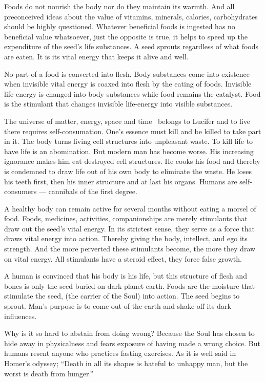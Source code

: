 \documentclass[12pt,letterpaper]{article}
\newcommand{\emdash}{---}
\newcommand{\mest}{matter, energy, space and time }
\begin{document}
Foods do not nourish the body nor do they maintain its warmth. And all
preconceived ideas about the value of vitamins, minerals, calories,
carbohydrates should be highly questioned. Whatever beneficial foods
is ingested has no beneficial value whatsoever, just the opposite is
true, it helps to speed up the expenditure of the seed's life
substances. A seed sprouts regardless of what foods are eaten. It is
its vital energy that keeps it alive and well.

No part of a food is converted into flesh. Body substances come into
existence when invisible vital energy is coaxed into flesh by the
eating of foods.  Invisible life-energy is changed into body
substances while food remains the catalyst. Food is the stimulant that
changes invisible life-energy into visible substances.

The universe of \mest\ belongs to Lucifer and to live there requires
self-consumation. One's essence must kill and be killed to take part
in it. The body turns living cell structures into unpleasant waste. To
kill life to have life is an abomination. But modern man has become
worse. His increasing ignorance makes him eat destroyed cell
structures. He cooks his food and thereby is condemned to draw life
out of his own body to eliminate the waste. He loses his teeth first,
then his inner structure and at last his organs. Humans are
self-consumers {\emdash} cannibals of the first degree.

A healthy body can remain active for several months without eating a
morsel of food. Foods, medicines, activities, companionships are
merely stimulants that draw out the seed's vital energy. In its
strictest sense, they serve as a force that draws vital energy into
action. Thereby giving the body, intellect, and ego its strength. And
the more perverted these stimulants become, the more they draw on
vital energy. All stimulants have a steroid effect, they force false
growth.

A human is convinced that his body is his life, but this structure of
flesh and bones is only the seed buried on dark planet earth. Foods
are the moisture that stimulate the seed, (the carrier of the Soul)
into action. The seed begins to sprout. Man's purpose is to come out
of the earth and shake off its dark influences.

Why is it so hard to abstain from doing wrong? Because the Soul has
chosen to hide away in physicalness and fears exposure of having made
a wrong choice.  But humans resent anyone who practices fasting
exercises. As it is well said in Homer's odyssey; ``Death in all its
shapes is hateful to unhappy man, but the worst is death from
hunger.''
\end{document}
